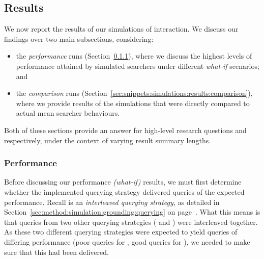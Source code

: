 \subsection{Results}\label{sec:snippets:simulations:results}
We now report the results of our simulations of interaction. We discuss our findings over two main subsections, considering:

\begin{itemize}
    \item{the \emph{performance} runs (Section~\ref{sec:snippets:simulations:results:perf}), where we discuss the highest levels of performance attained by simulated searchers under different \emph{what-if} scenarios; and}
    \item{the \emph{comparison} runs (Section~\ref{sec:snippets:simulations:results:comparison}), where we provide results of the simulations that were directly compared to actual mean searcher behaviours.}
\end{itemize}

Both of these sections provide an answer for high-level research questions  and  respectively, under the context of varying result summary lengths.

\subsubsection{Performance}\label{sec:snippets:simulations:results:perf}
Before discussing our performance \emph{(what-if)} results, we must first determine whether the implemented querying strategy  delivered queries of the expected performance. Recall  is an \emph{interleaved querying strategy,} as detailed in Section~\ref{sec:method:simulation:grounding:querying} on page~\pageref{sec:method:simulation:grounding:querying}. What this means is that queries from two other querying strategies ( and ) were interleaved together. As these two different querying strategies were expected to yield queries of differing performance (poor queries for , good queries for ), we needed to make sure that this had been delivered.


